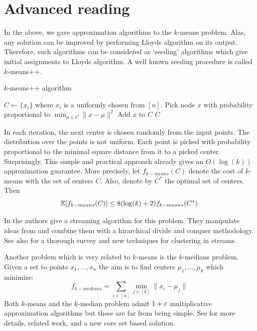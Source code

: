 \section{Advanced reading}

In the above, we gave approximation algorithms to the $k$-means problem.
Alas, any solution can be improved by performing Lloyds algorithm on its output.
Therefore, such algorithms can be considered as `seeding' algorithms 
which give initial assignments to Lloyds algorithm.
A well known seeding procedure \cite{ArthurV07} is called $k$-means++.
\begin{algorithm}
\caption{$k$-means++ algorithm  \cite{ArthurV07}}
\begin{algorithmic}
\STATE $C \leftarrow \{x_i\}$ where $x_i$ is a uniformly chosen from $[n]$.
	\STATE Pick node $x$ with probability proportional to $\min_{\mu \in C} \|x - \mu\|^2$
	\STATE Add $x$ to $C$
\ENDFOR
{} $C$
\end{algorithmic}
\end{algorithm}
In each iteration, the next center is chosen randomly from the input points.
The distribution over the points is not uniform. 
Each point is picked with probability proportional to the minimal square distance from it to a picked center.
Surprisingly, This simple and practical approach already gives an $O(\log(k))$ approximation guarantee.
More precisely, let $f_{k-means}(C)$ denote the cost of $k$-means with the set of centers $C$.
Also, denote by $C^*$ the optimal set of centers. Then 
\[
{\mathbb E}[f_{k-means}(C)] \le 8 (\log(k)+2)f_{k-means}(C^*)
\]

In \cite{AilonJM09} the authors give a streaming algorithm for this problem.
They manipulate ideas from \cite{ArthurV07} and combine them with a hirarchical 
divide and conquer methodology. See also \cite{GuhaMMMO03} for a thorough survey and
new techniques for clustering in streams.

Another problem which is very related to $k$-means is the $k$-medians problem.
Given a set to points $x_1,\ldots,x_n$ the aim is to find centers $\mu_1,\ldots,\mu_k$ which minimize:
\[
f_{k-medians} = \sum_{i \in [n]} \min_{j \in [k]} \|x_i - \mu_j \|
\]
Both $k$-means and the $k$-median problem admit $1+\varepsilon$ multiplicative approximation algorithms but these
are far from being simple. See \cite{hk-sckmk-05} for more details, related work, and a new core set based solution. 




















